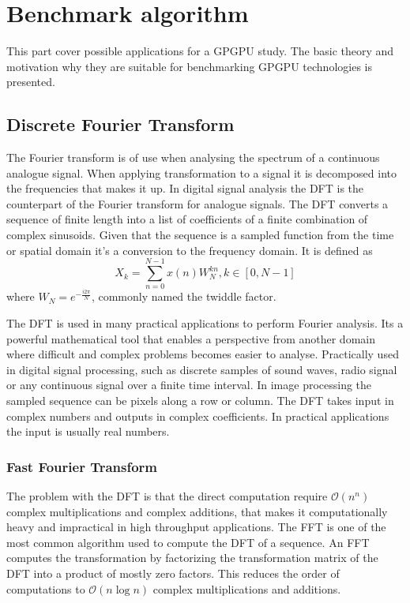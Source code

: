\chapter{Benchmark algorithm}\label{cha:algorithms}
This part cover possible applications for a \gls{GPGPU} study. The basic theory and motivation why they are suitable for benchmarking \gls{GPGPU} technologies is presented.%

\section{Discrete Fourier Transform}
The Fourier transform is of use when analysing the spectrum of a continuous analogue signal. When applying transformation to a signal it is decomposed into the frequencies that makes it up. In digital signal analysis the \gls{DFT} is the counterpart of the Fourier transform for analogue signals. The \gls{DFT} converts a sequence of finite length into a list of coefficients of a finite combination of complex sinusoids. Given that the sequence is a sampled function from the time or spatial domain it's a conversion to the frequency domain. It is defined as 
\begin{equation}
X_k=\sum_{n=0}^{N-1}x(n)W_N^{kn}, k \in {[0, N-1]}
\end{equation}
where $W_N=e^{-\frac{i2{\pi}}{N}}$, commonly named the twiddle factor\cite{gentleman1966fast}.

The \gls{DFT} is used in many practical applications to perform Fourier analysis. Its a powerful mathematical tool that enables a perspective from another domain where difficult and complex problems becomes easier to analyse. Practically used in digital signal processing, such as discrete samples of sound waves, radio signal or any continuous signal over a finite time interval. In image processing the sampled sequence can be pixels along a row or column. The \gls{DFT} takes input in complex numbers and outputs in complex coefficients. In practical applications the input is usually real numbers.

\subsection{Fast Fourier Transform}\label{sec:algorithms:fft}
The problem with the \gls{DFT} is that the direct computation require $\mathcal{O}(n^n)$ complex multiplications and complex additions, that makes it computationally heavy and impractical in high throughput applications. The \gls{FFT} is one of the most common algorithm used to compute the \gls{DFT} of a sequence. An \gls{FFT} computes the transformation by factorizing the transformation matrix of the \gls{DFT} into a product of mostly zero factors. This reduces the order of computations to $\mathcal{O}(n\log{}n)$ complex multiplications and additions.

